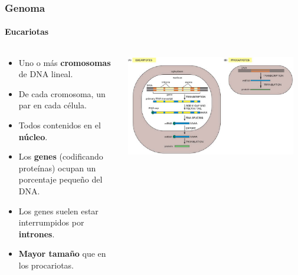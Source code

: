 \begin{frame}
\frametitle{Genoma}
\framesubtitle{Eucariotas}

\begin{columns}
\begin{column}{0.5\textwidth}
	\begin{itemize}
	    \item Uno o más \textbf{cromosomas} de DNA lineal.
	    \item De cada cromosoma, un par en cada célula.
	    \item Todos contenidos en el \textbf{núcleo}.
	    \item Los \textbf{genes} (codificando proteínas) ocupan un porcentaje pequeño del
	        DNA.
	    \item Los genes suelen estar interrumpidos por \textbf{intrones}.
	    \item \textbf{Mayor tamaño} que en los procariotas.
	\end{itemize}
\end{column}
\begin{column}{0.5\textwidth}
	\includegraphics[width=0.95\textwidth]{img/eucariota_procariota}
\end{column}
\end{columns}
\end{frame}

